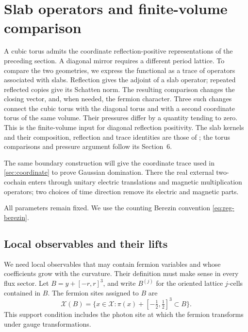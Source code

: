 \documentclass[11pt,letterpaper,reqno]{amsart}
\begin{document}
\section{Slab operators and finite-volume comparison}\label{sec:slab-comparison}

A cubic torus admits the coordinate reflection-positive representations
of the preceding section. A diagonal mirror requires a different period
lattice. To compare the two geometries, we express the functional as a
trace of operators associated with slabs. Reflection gives the adjoint
of a slab operator; repeated reflected copies give its Schatten norm.
The resulting comparison changes the closing vector, and, when needed,
the fermion character. Three such changes connect the cubic torus with
the diagonal torus and with a second coordinate torus of the same volume.
Their pressures differ by a quantity tending to zero. This is the
finite-volume input for diagonal reflection positivity. The slab kernels
and their composition, reflection and trace identities are those of
\cite[Sections~5.1--5.7, Theorem~5.29]{ChamberQED}; the torus comparisons
and pressure argument follow its Section~6.

The same boundary construction will give the coordinate trace used in
\cref{sec:coordinate} to prove Gaussian domination. There the real
external two-cochain enters through unitary electric translations and
magnetic multiplication operators; two choices of time direction
remove its electric and magnetic parts.

All parameters remain fixed. We use the counting Berezin convention
\eqref{eq:reg-berezin}.

\subsection{Local observables and their lifts}\label{subsec:slab-local}

We need local observables that may contain fermion variables and whose
coefficients grow with the curvature. Their definition must make sense
in every flux sector. Let $B=y+[-r,r]^3$, and write $B^{(j)}$ for the
oriented lattice $j$-cells contained in $B$. The fermion sites assigned
to $B$ are
\[
 \mathcal X(B)=\{x\in\mathcal X:
          \pi(x)+[-\tfrac12,\tfrac12]^3\subset B\}.
\]
This support condition includes the photon site at which the fermion
transforms under gauge transformations.
\end{document}

